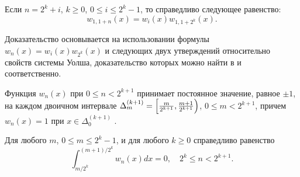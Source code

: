 \begin{theorem}\label{walsh-st-w1n-w12k}
	Если $n=2^k+i$, $k \ge 0$, $0 \le i \le 2^k-1$, то справедливо следующее равенство:
	\begin{equation*}
	w_{1,1+n}(x)=w_i(x)w_{1,1+2^k}(x).
	\end{equation*}
\end{theorem}
Доказательство основывается на использовании формулы $w_n(x)=w_i(x)w_{2^k}(x)$ \cite[с. 10, формула (1.1.5)]{walsh-GolubovBook} и следующих двух утверждений относительно свойств системы Уолша, доказательство которых можно найти в \cite[с. 11, теорема 1.1.3]{walsh-GolubovBook} и \cite[с. 11, теорема 1.1.4]{walsh-GolubovBook} соответственно.
\begin{statement}\label{walsh-w-const-on-delta}
	Функция $w_n(x)$ при $0 \le n < 2^{k+1}$ принимает постоянное значение, равное $\pm 1$, на каждом двоичном интервале 
	$\Delta_m^{(k+1)}=\Bigl[\frac{m}{2^{k+1}},\frac{m+1}{2^{k+1}}\Bigr)$, $0 \le m < 2^{k+1}$, причем $w_n(x)=1$ при $x \in \Delta_0^{(k+1)}$ .
\end{statement}
\begin{statement}\label{walsh-int-deltak-zero}
	Для любого $m$, $0 \le m \le 2^k-1$, и для любого $k \ge 0$ справедливо равенство 
	\begin{equation*}
	\int_{m/2^k}^{(m+1)/2^k}
	w_n(x)dx = 0, \quad 2^k \le n < 2^{k+1}.
	\end{equation*}
\end{statement}








